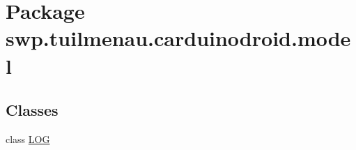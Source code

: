\hypertarget{namespaceswp_1_1tuilmenau_1_1carduinodroid_1_1model}{}\section{Package swp.\+tuilmenau.\+carduinodroid.\+model}
\label{namespaceswp_1_1tuilmenau_1_1carduinodroid_1_1model}
\subsection*{Classes}
\begin{DoxyCompactItemize}
\item 
class \hyperlink{classswp_1_1tuilmenau_1_1carduinodroid_1_1model_1_1_l_o_g}{L\+O\+G}
\end{DoxyCompactItemize}
